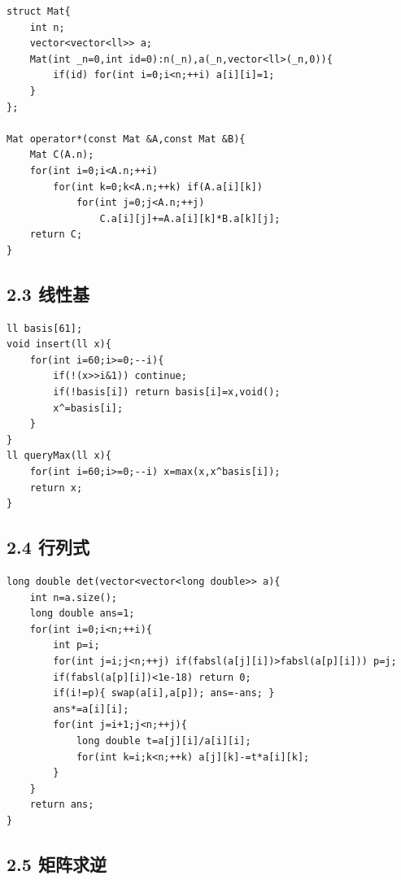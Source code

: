 \documentclass[UTF8,a4paper,11pt]{ctexart}
\begin{document}
\begin{Verbatim}[fontsize=\small,frame=single,breaklines=true,breakanywhere=true]
struct Mat{
    int n;
    vector<vector<ll>> a;
    Mat(int _n=0,int id=0):n(_n),a(_n,vector<ll>(_n,0)){
        if(id) for(int i=0;i<n;++i) a[i][i]=1;
    }
};

Mat operator*(const Mat &A,const Mat &B){
    Mat C(A.n);
    for(int i=0;i<A.n;++i)
        for(int k=0;k<A.n;++k) if(A.a[i][k])
            for(int j=0;j<A.n;++j)
                C.a[i][j]+=A.a[i][k]*B.a[k][j];
    return C;
}
\end{Verbatim}

\subsection*{2.3 线性基}

\begin{Verbatim}[fontsize=\small,frame=single,breaklines=true,breakanywhere=true]
ll basis[61];
void insert(ll x){
    for(int i=60;i>=0;--i){
        if(!(x>>i&1)) continue;
        if(!basis[i]) return basis[i]=x,void();
        x^=basis[i];
    }
}
ll queryMax(ll x){
    for(int i=60;i>=0;--i) x=max(x,x^basis[i]);
    return x;
}
\end{Verbatim}

\subsection*{2.4 行列式}

\begin{Verbatim}[fontsize=\small,frame=single,breaklines=true,breakanywhere=true]
long double det(vector<vector<long double>> a){
    int n=a.size();
    long double ans=1;
    for(int i=0;i<n;++i){
        int p=i;
        for(int j=i;j<n;++j) if(fabsl(a[j][i])>fabsl(a[p][i])) p=j;
        if(fabsl(a[p][i])<1e-18) return 0;
        if(i!=p){ swap(a[i],a[p]); ans=-ans; }
        ans*=a[i][i];
        for(int j=i+1;j<n;++j){
            long double t=a[j][i]/a[i][i];
            for(int k=i;k<n;++k) a[j][k]-=t*a[i][k];
        }
    }
    return ans;
}
\end{Verbatim}

\subsection*{2.5 矩阵求逆}
\end{document}
